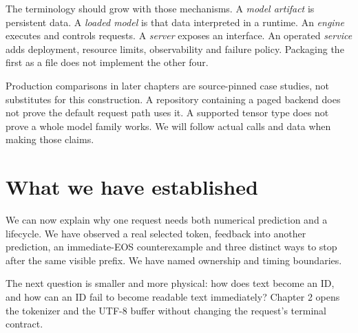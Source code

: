 The terminology should grow with those mechanisms. A \emph{model artifact}
is persistent data. A \emph{loaded model} is that data interpreted in a runtime.
An \emph{engine} executes and controls requests. A \emph{server} exposes an
interface. An operated \emph{service} adds deployment, resource limits,
observability and failure policy. Packaging the first as a file does not
implement the other four.

Production comparisons in later chapters are source-pinned case studies,
not substitutes for this construction. A repository containing a paged backend
does not prove the default request path uses it. A supported tensor type does
not prove a whole model family works. We will follow actual calls and data
when making those claims.

\section{What we have established}
We can now explain why one request needs both numerical prediction and a
lifecycle. We have observed a real selected token, feedback into another
prediction, an immediate-EOS counterexample and three distinct ways to stop
after the same visible prefix. We have named ownership and timing boundaries.

The next question is smaller and more physical: how does text become an ID,
and how can an ID fail to become readable text immediately? Chapter 2 opens
the tokenizer and the UTF-8 buffer without changing the request's terminal
contract.


